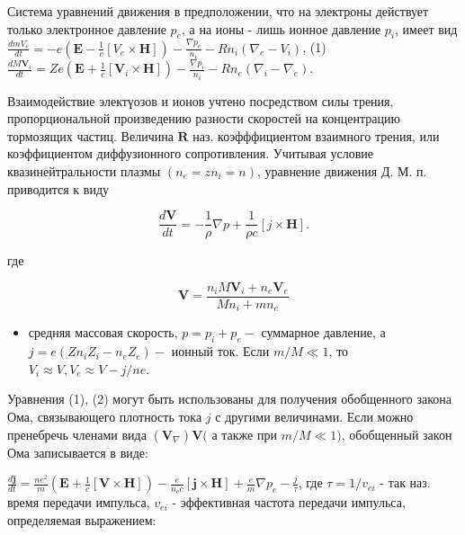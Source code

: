 \documentclass[10pt]{article}
\begin{document}
Система уравнений движения в предположении, что на электроны действует только электронное давление $p_{e}$, а на ионы - лишь ионное давление $p_{i}$, имеет вид $\frac{d m V_{e}}{d t}=-e\left(\boldsymbol{E}-\frac{1}{c}\left[V_{e} \times \boldsymbol{H}\right]\right)-\frac{\nabla p_{e}}{n_{e}}-R n_{i}\left(\nabla_{e}-V_{i}\right)$, (1) $\frac{d M \boldsymbol{V}_{i}}{d t}=Z e\left(\boldsymbol{E}+\frac{1}{c}\left[\boldsymbol{V}_{i} \times \boldsymbol{H}\right]\right)-\frac{\nabla p_{i}}{n_{i}}-R n_{e}\left(\nabla_{i}-\nabla_{e}\right)$.



Взаимодействие электүозов и ионов учтено посредством силы трения, пропорциональной произведению разности скоростей на концентрацию тормозящих частиц. Величина $\boldsymbol{R}$ наз. коэфффициентом взаимного трения, или коэффициентом диффузионного сопротивления. Учитывая условие квазинейтральности плазмы $\left(n_{e}=z n_{i}=n\right)$, уравнение движения Д. М. п. приводится к виду



\[

\frac{d \boldsymbol{V}}{d t}=-\frac{1}{\rho} \nabla p+\frac{1}{\rho c}[j \times \boldsymbol{H}] .

\]



где



\[

\boldsymbol{V}=\frac{n_{i} M \boldsymbol{V}_{i}+n_{e} \boldsymbol{V}_{e}}{M n_{i}+m n_{e}}

\]



\begin{itemize}

  \item средняя массовая скорость, $p=p_{i}+p_{e}-$ суммарное давление, а $j=e\left(Z n_{i} Z_{i}-n_{e} Z_{e}\right)-$ ионный ток. Если $m / M \ll 1$, то $V_{i} \approx V, V_{e} \approx V-j / n e$.

\end{itemize}



Уравнения (1), (2) могут быть использованы для получения обобщенного закона Ома, связывающего плотность тока $j$ с другими величинами. Если можно пренебречь членами вида $\left(\boldsymbol{V}_{\nabla}\right) \boldsymbol{V}($ а также при $m / M \ll 1)$, обобщенный закон Ома записывается в виде:



$\frac{d \boldsymbol{j}}{d t}=\frac{n e^{2}}{m}\left(\boldsymbol{E}+\frac{1}{c}[\boldsymbol{V} \times \boldsymbol{H}]\right)-\frac{e}{n_{c} c}[\boldsymbol{j} \times \boldsymbol{H}]+\frac{e}{m} \nabla p_{e}-\frac{j}{\tau}$, где $\tau=1 / v_{e i}$ - так наз. время передачи импульса, $v_{e i}$ - эффективная частота передачи импульса, определяемая выражением:
\end{document}
